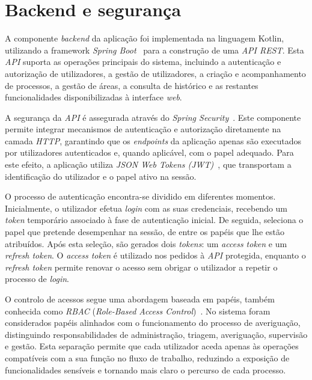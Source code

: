 \section{Backend e seguran\c{c}a} \label{sec:backend-seguranca}

A componente \textit{backend} da aplica\c{c}\~{a}o foi implementada na linguagem Kotlin, utilizando a framework \textit{Spring Boot}~\cite{spring-boot} para a constru\c{c}\~{a}o de uma \textit{API REST}. Esta \textit{API} suporta as opera\c{c}\~{o}es principais do sistema, incluindo a autentica\c{c}\~{a}o e autoriza\c{c}\~{a}o de utilizadores, a gest\~{a}o de utilizadores, a cria\c{c}\~{a}o e acompanhamento de processos, a gest\~{a}o de \'{a}reas, a consulta de hist\'{o}rico e as restantes funcionalidades disponibilizadas \`{a} interface \textit{web}.

A seguran\c{c}a da \textit{API} \'{e} assegurada atrav\'{e}s do \textit{Spring Security}~\cite{spring-security}. Este componente permite integrar mecanismos de autentica\c{c}\~{a}o e autoriza\c{c}\~{a}o diretamente na camada \textit{HTTP}, garantindo que os \textit{endpoints} da aplica\c{c}\~{a}o apenas s\~{a}o executados por utilizadores autenticados e, quando aplic\'{a}vel, com o papel adequado. Para este efeito, a aplica\c{c}\~{a}o utiliza \textit{JSON Web Tokens (JWT)}~\cite{rfc-jwt}, que transportam a identifica\c{c}\~{a}o do utilizador e o papel ativo na sess\~{a}o.

O processo de autentica\c{c}\~{a}o encontra-se dividido em diferentes momentos. Inicialmente, o utilizador efetua \textit{login} com as suas credenciais, recebendo um \textit{token} tempor\'{a}rio associado \`{a} fase de autentica\c{c}\~{a}o inicial. De seguida, seleciona o papel que pretende desempenhar na sess\~{a}o, de entre os pap\'{e}is que lhe est\~{a}o atribu\'{i}dos. Ap\'{o}s esta sele\c{c}\~{a}o, s\~{a}o gerados dois \textit{tokens}: um \textit{access token} e um \textit{refresh token}. O \textit{access token} \'{e} utilizado nos pedidos \`{a} \textit{API} protegida, enquanto o \textit{refresh token} permite renovar o acesso sem obrigar o utilizador a repetir o processo de \textit{login}.

O controlo de acessos segue uma abordagem baseada em pap\'{e}is, tamb\'{e}m conhecida como \textit{RBAC} (\textit{Role-Based Access Control})~\cite{nist-rbac}. No sistema foram considerados pap\'{e}is alinhados com o funcionamento do processo de averigua\c{c}\~{a}o, distinguindo responsabilidades de administra\c{c}\~{a}o, triagem, averigua\c{c}\~{a}o, supervis\~{a}o e gest\~{a}o. Esta separa\c{c}\~{a}o permite que cada utilizador aceda apenas \`{a}s opera\c{c}\~{o}es compat\'{i}veis com a sua fun\c{c}\~{a}o no fluxo de trabalho, reduzindo a exposi\c{c}\~{a}o de funcionalidades sens\'{i}veis e tornando mais claro o percurso de cada processo.

